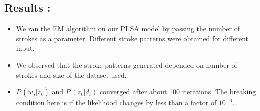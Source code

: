 \documentclass[10pt]{article}
\begin{document}
		\subsection{Results :}
			\begin{itemize}
				\item
				We ran the EM algorithm on our PLSA model by passing the number of strokes as a parameter. Different stroke patterns were obtained for different input.
				\item
				We observed that the stroke patterns generated depended on number of strokes and size of the dataset used.
				\item
				$P\,(w_j|z_k)$ and $P\,(z_k|d_i)$ converged after about 100 iterations.
				The breaking condition here is if the likelihood changes by less than a factor of $10^{-6}$.
			\end{itemize}
\end{document}
